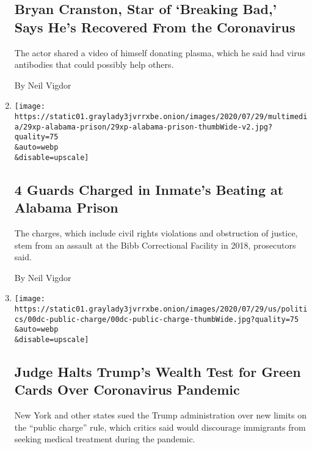 \begin{enumerate}
{  \subsection{Bryan Cranston, Star of `Breaking Bad,' Says He's
  Recovered From the
  Coronavirus}\label{bryan-cranston-star-of-breaking-bad-says-hes-recovered-from-the-coronavirus}}

  The actor shared a video of himself donating plasma, which he said had
  virus antibodies that could possibly help others.

  By Neil Vigdor
\item
  \href{/2020/07/30/us/alabama-correction-officers-charged.html}{}

  \texttt{[image: https://static01.graylady3jvrrxbe.onion/images/2020/07/29/multimedia/29xp-alabama-prison/29xp-alabama-prison-thumbWide-v2.jpg?quality=75\\\&auto=webp\\\&disable=upscale]}

  \hypertarget{4-guards-charged-in-inmates-beating-at-alabama-prison}{%
  \subsection{4 Guards Charged in Inmate's Beating at Alabama
  Prison}\label{4-guards-charged-in-inmates-beating-at-alabama-prison}}

  The charges, which include civil rights violations and obstruction of
  justice, stem from an assault at the Bibb Correctional Facility in
  2018, prosecutors said.

  By Neil Vigdor
\item
  \href{/2020/07/30/us/trump-green-card.html}{}

  \texttt{[image: https://static01.graylady3jvrrxbe.onion/images/2020/07/29/us/politics/00dc-public-charge/00dc-public-charge-thumbWide.jpg?quality=75\\\&auto=webp\\\&disable=upscale]}

  \hypertarget{judge-halts-trumps-wealth-test-for-green-cards-over-coronavirus-pandemic}{%
  \subsection{Judge Halts Trump's Wealth Test for Green Cards Over
  Coronavirus
  Pandemic}\label{judge-halts-trumps-wealth-test-for-green-cards-over-coronavirus-pandemic}}

  New York and other states sued the Trump administration over new
  limits on the ``public charge'' rule, which critics said would
  discourage immigrants from seeking medical treatment during the
  pandemic.


\end{enumerate}

